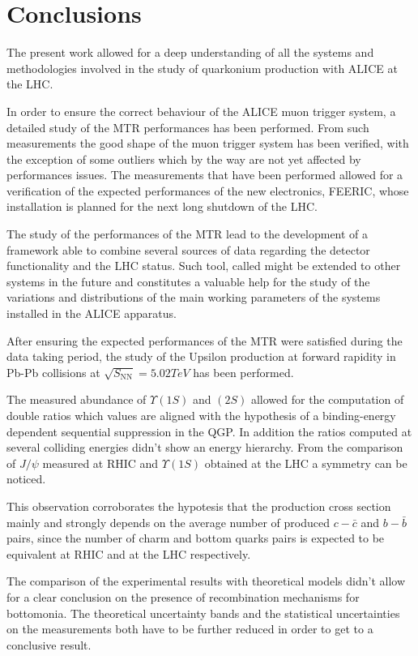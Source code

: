 \chapter{Conclusions}

The present work allowed for a deep understanding of all the systems and methodologies involved in the study of quarkonium production with ALICE at the LHC.

In order to ensure the correct behaviour of the ALICE muon trigger system, a detailed study of the MTR performances has been performed.
From such measurements the good shape of the muon trigger system has been verified, with the exception of some outliers which by the way are not yet affected by performances issues.
The measurements that have been performed allowed for a verification of the expected performances of the new electronics, FEERIC, whose installation is planned for the next long shutdown of the LHC.

The study of the performances of the MTR lead to the development of a framework able to combine several sources of data regarding the detector functionality and the LHC status.
Such tool, called  might be extended to other systems in the future and constitutes a valuable help for the study of the variations and distributions of the main working parameters of the systems installed in the ALICE apparatus.


After ensuring the expected performances of the MTR were satisfied during the data taking period, the study of the Upsilon production at forward rapidity in Pb-Pb collisions at $\sqrt{S_{\mathrm{NN}}}=5.02TeV$ has been performed.

The measured abundance of $\Upsilon(1S)$ and $(2S)$ allowed for the computation of double ratios which values are aligned with the hypothesis of a binding-energy dependent sequential suppression in the QGP.
In addition the ratios computed at several colliding energies didn't show an energy hierarchy.
From the comparison of $J/\psi$ measured at RHIC and $\Upsilon(1S)$ obtained at the LHC a symmetry can be noticed.

This observation corroborates the hypotesis that the production cross section mainly and strongly depends on the average number of produced $c-\bar{c}$ and $b-\bar{b}$ pairs, since the number of charm and bottom quarks pairs is expected to be equivalent at RHIC and at the LHC respectively.

The comparison of the experimental results with theoretical models didn't allow for a clear conclusion on the presence of recombination mechanisms for bottomonia.
The theoretical uncertainty bands and the statistical uncertainties on the measurements both have to be further reduced in order to get to a conclusive result.



